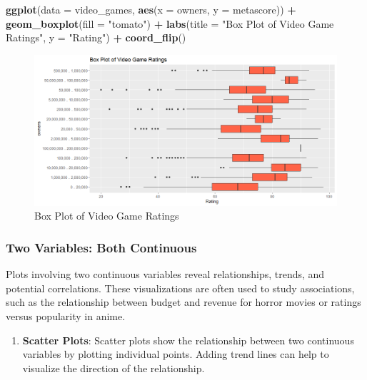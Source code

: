 \documentclass[
]{book}
\newenvironment{Shaded}{\begin{snugshade}}{\end{snugshade}}
\newcommand{\AttributeTok}[1]{\textcolor[rgb]{0.13,0.29,0.53}{#1}}
\newcommand{\FunctionTok}[1]{\textcolor[rgb]{0.13,0.29,0.53}{\textbf{#1}}}
\newcommand{\NormalTok}[1]{#1}
\newcommand{\SpecialCharTok}[1]{\textcolor[rgb]{0.81,0.36,0.00}{\textbf{#1}}}
\newcommand{\StringTok}[1]{\textcolor[rgb]{0.31,0.60,0.02}{#1}}
\providecommand{\tightlist}{%
  \setlength{\itemsep}{0pt}\setlength{\parskip}{0pt}}
\begin{document}
\begin{Shaded}
\begin{Highlighting}[]
\FunctionTok{ggplot}\NormalTok{(}\AttributeTok{data =}\NormalTok{ video\_games, }\FunctionTok{aes}\NormalTok{(}\AttributeTok{x =}\NormalTok{ owners, }\AttributeTok{y =}\NormalTok{ metascore)) }\SpecialCharTok{+}
  \FunctionTok{geom\_boxplot}\NormalTok{(}\AttributeTok{fill =} \StringTok{"tomato"}\NormalTok{) }\SpecialCharTok{+}
  \FunctionTok{labs}\NormalTok{(}\AttributeTok{title =} \StringTok{"Box Plot of Video Game Ratings"}\NormalTok{, }\AttributeTok{y =} \StringTok{"Rating"}\NormalTok{) }\SpecialCharTok{+}
  \FunctionTok{coord\_flip}\NormalTok{()}
\end{Highlighting}
\end{Shaded}

\begin{figure}
\centering
\includegraphics[width=1\textwidth,height=\textheight]{images/box_plotsv1.png}
\caption{Box Plot of Video Game Ratings}
\end{figure}

\subsubsection*{Two Variables: Both Continuous}\label{two-variables-both-continuous}

Plots involving two continuous variables reveal relationships, trends, and potential correlations. These visualizations are often used to study associations, such as the relationship between budget and revenue for horror movies or ratings versus popularity in anime.

\begin{enumerate}
\def\labelenumi{\arabic{enumi}.}
\tightlist
\item
  \textbf{Scatter Plots}: Scatter plots show the relationship between two continuous variables by plotting individual points. Adding trend lines can help to visualize the direction of the relationship.
\end{enumerate}
\end{document}
